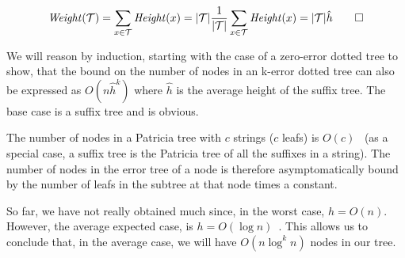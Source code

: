 \[ \mathit{Weight}(\mathcal{T}) = \sum_{x \in \mathcal{T}}\mathit{Height}(x) = |\mathcal{T}|\frac{1}{|\mathcal{T}|}\sum_{x \in \mathcal{T}}\mathit{Height}(x) = |\mathcal{T}|\hat{h} \qed \]

We will reason by induction, starting with the case of a zero-error dotted tree to show, that the bound on the number of nodes in an k-error dotted tree can also be expressed as $O(n\hat{h}^k)$ where $\hat{h}$ is the average height of the suffix tree. The base case is a suffix tree and is obvious.

The number of nodes in a Patricia tree with $c$ strings ($c$ leafs) is $O(c)$~\cite{patricia} (as a special case, a suffix tree is the Patricia tree of all the suffixes in a string). The number of nodes in the error tree of a node is therefore asymptomatically bound by the number of leafs in the subtree at that node times a constant.




So far, we have not really obtained much since, in the worst case, $h=O(n)$. However, the average expected case, is $h=O(\log n)$~\cite{devroye:note,szpankowski:unexpected}. This allows us to conclude that, in the average case, we will have $O(n\log^k n)$ nodes in our tree.

